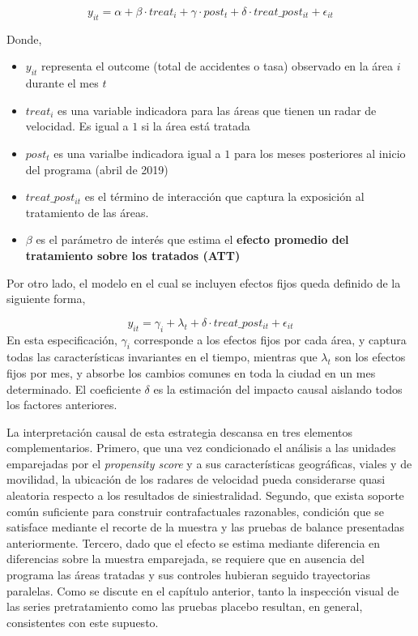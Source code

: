 \[
    y_{it} = \alpha + \beta \cdot treat_i + \gamma \cdot post_t + \delta \cdot treat\_post_{it} + \epsilon_{it}
\]

Donde,
\begin{itemize}
    \item $y_{it}$ representa el outcome (total de accidentes o tasa) observado en la área $i$ durante el mes $t$
    \item $treat_i$ es una variable indicadora para las áreas que tienen un radar de velocidad. Es igual a $1$ si la área está tratada
    \item $post_t$ es una varialbe indicadora igual a $1$ para los meses posteriores al inicio del programa (abril de 2019)
    \item $treat\_post_{it}$ es el término de interacción que captura la exposición al tratamiento de las áreas. 
    \item $\beta$ es el parámetro de interés que estima el \textbf{efecto promedio del tratamiento sobre los tratados (ATT)}
\end{itemize}

\noindent Por otro lado, el modelo en el cual se incluyen efectos fijos queda definido de la siguiente forma,

\[
    y_{it} = \gamma_i + \lambda_t + \delta \cdot treat\_post_{it} + \epsilon_{it}
\]
En esta especificación, $\gamma_i$ corresponde a los efectos fijos por cada área, y captura todas las características invariantes en el tiempo, mientras que $\lambda_t$ son los efectos fijos por mes, y absorbe los cambios comunes en toda la ciudad en un mes determinado. El coeficiente $\delta$ es la estimación del impacto causal aislando todos los factores anteriores. 

La interpretación causal de esta estrategia descansa en tres elementos complementarios. Primero, que una vez condicionado el análisis a las unidades emparejadas por el \textit{propensity score} y a sus características geográficas, viales y de movilidad, la ubicación de los radares de velocidad pueda considerarse quasi aleatoria respecto a los resultados de siniestralidad. Segundo, que exista soporte común suficiente para construir contrafactuales razonables, condición que se satisface mediante el recorte de la muestra y las pruebas de balance presentadas anteriormente. Tercero, dado que el efecto se estima mediante diferencia en diferencias sobre la muestra emparejada, se requiere que en ausencia del programa las áreas tratadas y sus controles hubieran seguido trayectorias paralelas. Como se discute en el capítulo anterior, tanto la inspección visual de las series pretratamiento como las pruebas placebo resultan, en general, consistentes con este supuesto. 

